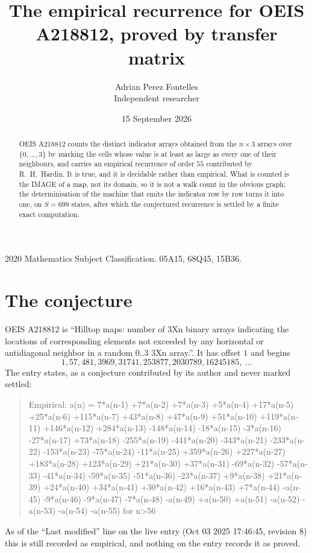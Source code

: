 \documentclass[11pt,a4paper]{article}
\title{The empirical recurrence for OEIS A218812, proved by transfer matrix}
\author{Adrian Perez Fontelles\\ \small Independent researcher}
\date{15 September 2026}
\theoremstyle{plain}
\theoremstyle{definition}
\begin{document}
\maketitle

\begin{abstract}
OEIS A218812 counts the distinct indicator arrays obtained from the $n\times3$ arrays over
$\{0,\dots,3\}$ by marking the cells whose value is at least as large as every one of their neighbours, and carries an
empirical recurrence of order $55$ contributed by R.~H.~Hardin. It is true, and it is
decidable rather than empirical. What is counted is the IMAGE of a map, not its domain, so it
is not a walk count in the obvious graph; the determinisation of the machine that emits the
indicator row by row turns it into one, on $S=699$ states, after which the conjectured
recurrence is settled by a finite exact computation.
\end{abstract}

\noindent\small 2020 Mathematics Subject Classification. 05A15, 68Q45, 15B36.\normalsize

\section{The conjecture}

OEIS A218812 is ``Hilltop maps: number of 3Xn binary arrays indicating the locations of corresponding elements not exceeded by any horizontal or antidiagonal neighbor in a random 0..3 3Xn array.''. It has offset $1$ and begins
\[
1, 57, 481, 3969, 31741, 253877, 2030789, 16245185,\ \dots
\]
The entry states, as a conjecture contributed by its author and never marked settled:
\begin{quote}
Empirical: a(n) = 7*a(n-1) +7*a(n-2) +7*a(n-3) +5*a(n-4) +17*a(n-5) +25*a(n-6) +115*a(n-7) +43*a(n-8) +47*a(n-9) +51*a(n-10) +119*a(n-11) +146*a(n-12) +284*a(n-13) -148*a(n-14) -18*a(n-15) -3*a(n-16) -27*a(n-17) +73*a(n-18) -255*a(n-19) -441*a(n-20) -343*a(n-21) -233*a(n-22) -153*a(n-23) -75*a(n-24) -11*a(n-25) +359*a(n-26) +227*a(n-27) +183*a(n-28) +123*a(n-29) +21*a(n-30) +37*a(n-31) -69*a(n-32) -57*a(n-33) -41*a(n-34) -59*a(n-35) -51*a(n-36) -23*a(n-37) +9*a(n-38) +21*a(n-39) +24*a(n-40) +34*a(n-41) +30*a(n-42) +16*a(n-43) +7*a(n-44) -a(n-45) -9*a(n-46) -9*a(n-47) -7*a(n-48) -a(n-49) +a(n-50) +a(n-51) -a(n-52) -a(n-53) -a(n-54) -a(n-55) for n>56
\end{quote}
As of the ``Last modified'' line on the live entry (Oct 03 2025 17:46:45, revision 8) this is still
recorded as empirical, and nothing on the entry records it as proved.
\end{document}
